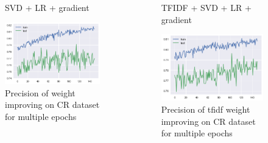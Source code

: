 \documentclass[xcolor={table}]{beamer}
\begin{document}
\begin{frame}{}
	\begin{columns}
   				\begin{figure}[H]
        			\centering
        			\caption*{SVD + LR + gradient}
        			\includegraphics[height=0.4\textheight]{images/CRDataset_grad.png}
        			\caption{Precision of weight improving on CR dataset for multiple epochs}
        		\end{figure}

        		\begin{figure}[H]
        			\centering
        			\caption*{TFIDF + SVD + LR + gradient}
        			\includegraphics[height=0.4\textheight]{images/CRDataset_tfidf_grad.png}
        			\caption{Precision of tfidf weight improving on CR dataset for multiple epochs}
        		\end{figure}
	\end{columns}        		
\end{frame} 
\end{document}
